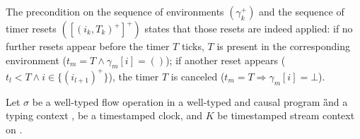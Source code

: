 \begin{remark}
    The precondition on the sequence of environments $(\gamma_k^+)$ and the sequence of timer resets
    $([(i_k, T_k)^+]^+)$ states that those resets are indeed applied: if no further resets appear
    before the timer $T$ ticks, $T$ is present in the corresponding environment ($t_m = T \wedge
        \gamma_m[i] = ()$); if another reset appears ($t_l < T \wedge i \in \{(i_{l+1})^+\}$), the
    timer $T$ is canceled ($t_m = T \Rightarrow \gamma_m[i] = \bot$).
\end{remark}
\begin{skippableproof}
    Let $\sigma$ be a well-typed flow operation in a well-typed and causal program \G and a
    typing context \tyCtx, \tck be a timestamped clock, and $K$ be timestamped stream context on
    \tck.


\end{skippableproof}
